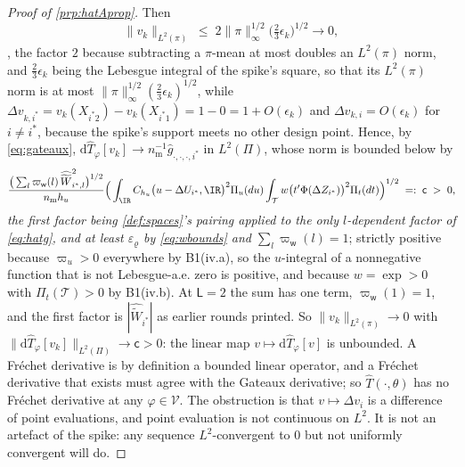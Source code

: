 \begin{proof}[Proof of \cref{prp:hatAprop}]
Then
\[
\|v_k\|_{L^{2}(\pi)}\;\le\;2\|\pi\|_\infty^{1/2}\big(\tfrac23\epsilon_k\big)^{1/2}\longrightarrow0,
\]
, the factor $2$ because subtracting a $\pi$-mean at most doubles an $L^{2}(\pi)$ norm, and
$\tfrac23\epsilon_k$ being the Lebesgue integral of the spike's square, so that its $L^{2}(\pi)$ norm is
at most $\|\pi\|_\infty^{1/2}(\tfrac23\epsilon_k)^{1/2}$, 
while $\Delta v_{k,i^\ast}=v_k(X_{i^\ast2})-v_k(X_{i^\ast1})=1-0=1+O(\epsilon_k)$ and
$\Delta v_{k,i}=O(\epsilon_k)$ for $i\ne i^\ast$, because the spike's support meets no other design
point. Hence, by \eqref{eq:gateaux},
$\mathrm d\hat T_\varphi[v_k]\to n_{\mathrm m}^{-1}\hat g_{\cdot,\cdot,\cdot,i^\ast}$ in $L^{2}(\Pi)$, whose
norm is bounded below by
\[
\frac{\big(\sum_{l}\varpi_{\mathsf w}(l)\,\widehat{\widetilde W}_{i^\ast,l}^{2}\big)^{1/2}}{n_{\mathrm m}h_u}
\Big(\int_{\IR}C_{h_u}\big(u-\Delta U_{i^\ast},\IR\big)^{2}\Pi_u(du)\int_{\mathcal T}w\big(t'\Phi(\Delta Z_{i^\ast})\big)^{2}\Pi_t(dt)\Big)^{1/2}
\;=:\;\mathsf c\;>\;0 ,
\]
\emph{the first factor being \cref{def:spaces}'s pairing applied to the only $l$-dependent factor of
\eqref{eq:hatg}, and at least $\varepsilon_\varrho$ by \eqref{eq:wbounds} and
$\sum_l\varpi_{\mathsf w}(l)=1$}; strictly positive because $\varpi_u>0$ everywhere by B1(iv.a), so the $u$-integral of a nonnegative
function that is not Lebesgue-a.e. zero is positive, and because $w=\exp>0$ with
$\Pi_t(\mathcal T)>0$ by B1(iv.b). At $\mathsf L=2$ the sum has one term,
$\varpi_{\mathsf w}(1)=1$, and the first factor is $|\widehat{\widetilde W}_{i^\ast}|$ as earlier rounds
printed. So $\|v_k\|_{L^{2}(\pi)}\to0$ with
$\|\mathrm d\hat T_\varphi[v_k]\|_{L^{2}(\Pi)}\to\mathsf c>0$: the linear map
$v\mapsto\mathrm d\hat T_\varphi[v]$ is unbounded. A Fr\'echet derivative is by definition a bounded
linear operator, and a Fr\'echet derivative that exists must agree with the Gateaux derivative; so
$\hat T(\cdot,\theta)$ has no Fr\'echet derivative at any $\varphi\in\mathcal V$.
The obstruction is that $v\mapsto\Delta v_i$ is a difference of point evaluations, and point
evaluation is not continuous on $L^{2}$. It is not an artefact of the spike: any sequence
$L^{2}$-convergent to $0$ but not uniformly convergent will do.
\end{proof}

